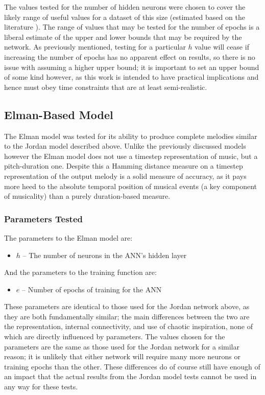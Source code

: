 \documentclass[ author={Stephen Livermore-Tozer},
				supervisor={Dr. Peter Flach},
				degree={MEng},
				title={Algorithmic Co-composition Using Machine Learning},
				subtitle={},
				type={research},
				year={2016} ]{dissertation}
\begin{document}
	The values tested for the number of hidden neurons were chosen to cover the likely range of useful values for a dataset of this size (estimated based on the literature \cite{todd1989connectionist}). The range of values that may be tested for the number of epochs is a liberal estimate of the upper and lower bounds that may be required by the network. As previously mentioned, testing for a particular $h$ value will cease if increasing the number of epochs has no apparent effect on results, so there is no issue with assuming a higher upper bound; it is important to set an upper bound of some kind however, as this work is intended to have practical implications and hence must obey time constraints that are at least semi-realistic.
	
	\subsection{Elman-Based Model}
	
	The Elman model was tested for its ability to produce complete melodies similar to the Jordan model described above. Unlike the previously discussed models however the Elman model does not use a timestep representation of music, but a pitch-duration one. Despite this a Hamming distance measure on a timestep representation of the output melody is a solid measure of accuracy, as it pays more heed to the absolute temporal position of musical events (a key component of musicality) than a purely duration-based measure.
	
	\subsubsection{Parameters Tested}
	
	The parameters to the Elman model are:
	\begin{itemize}
		\item $h$ -- The number of neurons in the ANN's hidden layer
	\end{itemize}
	And the parameters to the training function are:
	\begin{itemize}
		\item $e$ -- Number of epochs of training for the ANN
	\end{itemize}
	
	These parameters are identical to those used for the Jordan network above, as they are both fundamentally similar; the main differences between the two are the representation, internal connectivity, and use of chaotic inspiration, none of which are directly influenced by parameters. The values chosen for the parameters are the same as those used for the Jordan network for a similar reason; it is unlikely that either network will require many more neurons or training epochs than the other. These differences do of course still have enough of an impact that the actual results from the Jordan model tests cannot be used in any way for these tests.
	
\end{document}

